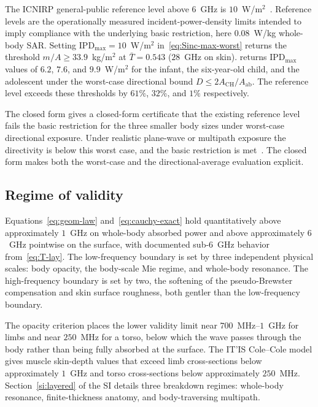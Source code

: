 \documentclass[journal,twocolumn,10pt]{IEEEtran}
\theoremstyle{plain}
\theoremstyle{remark}
\newcommand{\IPD}{\mathrm{IPD}}
\newcommand{\Aab}{A_{\mathrm{ab}}}
\newcommand{\Tbar}{\bar{T}}
\begin{document}
The ICNIRP general-public reference level above $6$~GHz is
$10$~W/m$^2$~\cite{ICNIRP2020}. Reference levels are the
operationally measured incident-power-density limits intended to
imply compliance with the underlying basic restriction, here
$0.08$~W/kg whole-body SAR. Setting $\IPD_{\mathrm{max}} =
10$~W/m$^2$ in~\eqref{eq:Sinc-max-worst} returns the threshold
$m/A \geq 33.9$~kg/m$^2$ at $\Tbar = 0.543$ ($28$~GHz on skin).
 returns $\IPD_{\mathrm{max}}$ values of $6.2$,
$7.6$, and $9.9$~W/m$^2$ for the infant, the six-year-old child, and
the adolescent under the worst-case directional bound
$D \le 2A_{\mathrm{CH}}/\Aab$. The reference level exceeds these
thresholds by $61\%$, $32\%$, and $1\%$ respectively.

The closed form gives a closed-form certificate that the existing
reference level fails the basic restriction for the three smaller
body sizes under worst-case directional exposure. Under realistic
plane-wave or multipath exposure the directivity is below this
worst case, and the basic restriction is met~\cite{ICNIRP2020}. The
closed form makes both the worst-case and the directional-average
evaluation explicit.

\subsection{Regime of validity}\label{subsec:disc-validity}

Equations~\eqref{eq:geom-law} and~\eqref{eq:cauchy-exact} hold
quantitatively above approximately $1$~GHz on whole-body absorbed
power and above approximately $6$~GHz pointwise on the surface, with
documented sub-$6$~GHz behavior from~\eqref{eq:T-lay}. The
low-frequency boundary is set by three independent physical scales:
body opacity, the body-scale Mie regime, and whole-body resonance.
The high-frequency boundary is set by two, the softening of the
pseudo-Brewster compensation and skin surface roughness, both gentler
than the low-frequency boundary.

The opacity criterion places the lower validity limit near
$700$~MHz--$1$~GHz for limbs and near $250$~MHz for a torso, below
which the wave passes through the body rather than being fully
absorbed at the surface. The IT'IS Cole--Cole model gives muscle
skin-depth values that exceed limb cross-sections below approximately
$1$~GHz and torso cross-sections below approximately $250$~MHz.
Section~\ref{si:layered} of the SI details three breakdown regimes:
whole-body resonance, finite-thickness anatomy, and body-traversing
multipath.
\end{document}
